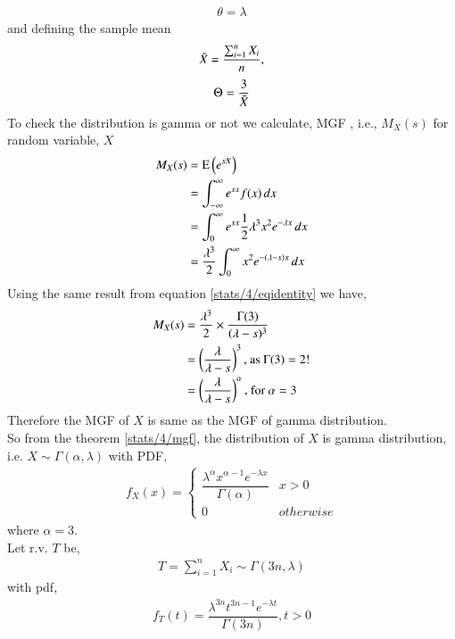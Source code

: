\begin{enumerate}
\begin{align}
         \theta = \lambda
     \end{align}
    and defining the sample mean
    \begin{align}
        \Bar{X} = \dfrac{\sum_{i=1}^{n} X_i}{n},
    \end{align}
    \begin{align}
        \Theta = \dfrac{3}{ \Bar{X}} 
    \end{align}
    To check the distribution is gamma or not we calculate, MGF , i.e., $ M_X(s) $ for random variable, $ X $
    \begin{align}
        M_X(s) &= \text{E}\left( e^{sX} \right) \\
        &=  \int_{-\infty}^{\infty} e^{sx} f(x)\,dx \\
        &=    \int_{0}^{\infty} e^{sx} \dfrac{1}{2} \lambda^3x^2e^{-\lambda x}\,dx \\
        &= \dfrac{\lambda^3}{2} \int_{0}^{\infty} x^2 e^{-(\lambda - s) x}\,dx 
    \end{align}
    Using the same result from equation \eqref{stats/4/eqidentity} we have,
    \begin{align}
        M_X(s) & = \dfrac{\lambda^3}{2} \times \dfrac{\Gamma(3)}{(\lambda- s)^3} \\
        &= \left(\dfrac{\lambda}{\lambda-s}\right)^3  \text{, as $\Gamma(3) = 2!$} \\
        &= \left(\dfrac{\lambda}{\lambda-s}\right)^\alpha  \text{, for $\alpha= 3$} 
    \end{align}
    Therefore the MGF of $ X $ is same as the MGF of gamma distribution. \\
    So from the theorem \ref{stats/4/mgf}, the distribution of $ X$ is gamma distribution, i.e. $ X \sim \Gamma(\alpha,\lambda)$ with PDF,
    \begin{align}
    f_{X}(x)  = 
    \begin{cases}
    \dfrac{\lambda^{\alpha}x^{\alpha-1}e^{-\lambda x}}{\Gamma(\alpha)} &  x > 0
    \\
    0 & otherwise
    \end{cases}
    \end{align}
    where $ \alpha = 3 $. \\
    Let r.v. $T $ be,
    \begin{align}
        T = \sum_{i=1}^{n} X_i \sim \Gamma(3n, \lambda)
    \end{align}
    with pdf,
    \begin{align}
        f_T(t)= \dfrac{\lambda^{3n} t^{3n-1}e^{-\lambda t}}{\Gamma(3n)} , t>0

\end{align}
\end{enumerate}
